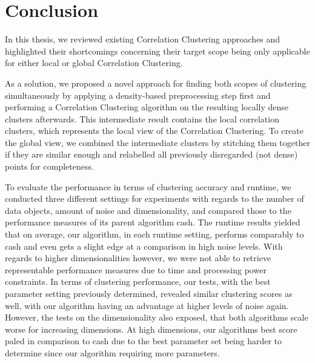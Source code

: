 \chapter{Conclusion}\label{ch:conclusion}
In this thesis, we reviewed existing Correlation Clustering approaches and highlighted their shortcomings concerning their target scope being only applicable for either local or global Correlation Clustering. 

As a solution, we proposed a novel approach for finding both scopes of clustering simultaneously by applying a density-based preprocessing step first and performing a Correlation Clustering algorithm on the resulting locally dense clusters afterwards. This intermediate result contains the local correlation clusters, which represents the local view of the Correlation Clustering. To create the global view, we combined the intermediate clusters by stitching them together if they are similar enough and relabelled all previously disregarded (not dense) points for completeness.

To evaluate the performance in terms of clustering accuracy and runtime, we conducted three different settings for experiments with regards to the number of data objects, amount of noise and dimensionality, and compared those to the performance measures of its parent algorithm \gls{cash}. 
The runtime results yielded that on average, our algorithm, in each runtime setting, performs comparably to \gls{cash} and even gets a slight edge at a comparison in high noise levels. With regards to higher dimensionalities however, we were not able to retrieve representable performance measures due to time and processing power constraints. In terms of clustering performance, our tests, with the best parameter setting previously determined, revealed similar clustering scores as well, with our algorithm having an advantage at higher levels of noise again. However, the tests on the dimensionality also exposed, that both algorithms scale worse for increasing dimensions. At high dimensions, our algorithms best score paled in comparison to \gls{cash} due to the best parameter set being harder to determine since our algorithm requiring more parameters.

